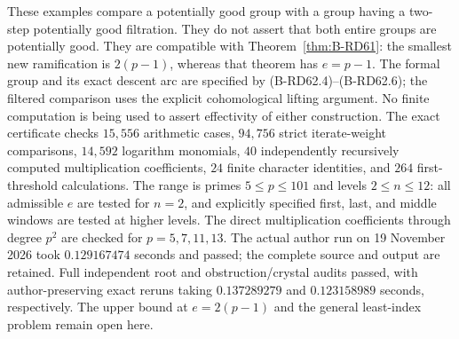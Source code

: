 \begin{remark}
\label{rem:B-RD62-scope}
These examples compare a potentially good group with a group having
a two-step potentially good filtration.  They do not assert that
both entire groups are potentially good.  They are compatible with
Theorem~\ref{thm:B-RD61}: the smallest new ramification is $2(p-1)$,
whereas that theorem has $e=p-1$.  The formal group and its exact
descent arc are specified by (B-RD62.4)--(B-RD62.6); the filtered
comparison uses the explicit cohomological lifting argument.
No finite computation is being used to assert effectivity of either
construction.  The exact certificate
checks $15{,}556$ arithmetic cases, $94{,}756$ strict iterate-weight
comparisons, $14{,}592$ logarithm monomials, $40$ independently
recursively computed multiplication coefficients, $24$ finite
character identities, and $264$ first-threshold calculations.
The range is primes $5\le p\le101$ and levels $2\le n\le12$:
all admissible $e$ are tested for $n=2$, and explicitly specified
first, last, and middle windows are tested at higher levels.
The direct multiplication coefficients through degree $p^2$ are
checked for $p=5,7,11,13$.  The actual author run on
19 November 2026 took $0.129167474$ seconds and passed; the complete
source and output are retained.  Full independent root and obstruction/crystal
audits passed, with author-preserving exact reruns taking
$0.137289279$ and $0.123158989$ seconds, respectively.
The upper bound at $e=2(p-1)$
and the general least-index problem remain open here.
\end{remark}
